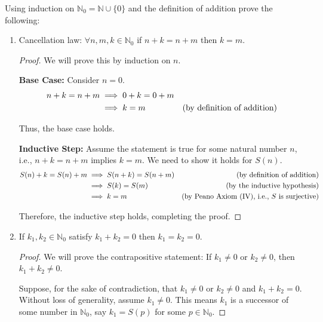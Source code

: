 \documentclass[10pt]{article}
\newcommand{\N}{\mathbb{N}}
\newenvironment{problem}[2][Problem]{\begin{trivlist}
\item[\hskip \labelsep {\bfseries #1}\hskip \labelsep {\bfseries #2.}]}{\end{trivlist}}
\begin{document}
\newpage
\begin{problem}{2}
	Using induction on $ \N_0=\N \cup \{0\} $ and the definition of addition prove the following:
	\begin{enumerate}
		\item Cancellation law: $ \forall n,m,k \in \N_0 $ if $ n+k=n+m $ then $ k=m $.
            \begin{proof}
                We will prove this by induction on \( n \).

                \textbf{Base Case:} Consider \( n = 0 \).
                \begin{align*}
                    n +k = n + m &\implies 0 + k = 0 + m &  \hfill \\
                                 &\implies k = m & \text{(by definition of addition)} \hfill
                \end{align*}

                Thus, the base case holds.

                \textbf{Inductive Step:} Assume the statement is true for some natural number \( n \), i.e., \( n + k = n + m \) implies \( k = m \). We need to show it holds for \( S(n) \).
                \begin{align*}
                    S(n) + k = S(n) + m &\implies S(n + k) = S(n + m) & \text{(by definition of addition)} \hfill \\
                                        &\implies S(k) = S(m) & \text{(by the inductive hypothesis)} \hfill \\
                                        &\implies k = m & \text{(by Peano Axiom (IV), i.e., $S$ is surjective)} \hfill
                \end{align*}

                Therefore, the inductive step holds, completing the proof.
            \end{proof}


            \item If $ k_1, k_2 \in \N_0 $ satisfy $ k_1+k_2=0 $ then $ k_1=k_2=0 $.
                \begin{proof}
                    We will prove the contrapositive statement: If \( k_1 \neq 0 \) or \( k_2 \neq 0 \), then \( k_1 + k_2 \neq 0 \).

                    Suppose, for the sake of contradiction, that \( k_1 \neq 0 \) or \( k_2 \neq 0 \) and \( k_1 + k_2 = 0 \). Without loss of generality, assume \( k_1 \neq 0 \). This means \( k_1 \) is a successor of some number in \( \N_0 \), say \( k_1 = S(p) \) for some \( p \in \N_0 \).


\end{proof}
\end{enumerate}
\end{problem}
\end{document}
